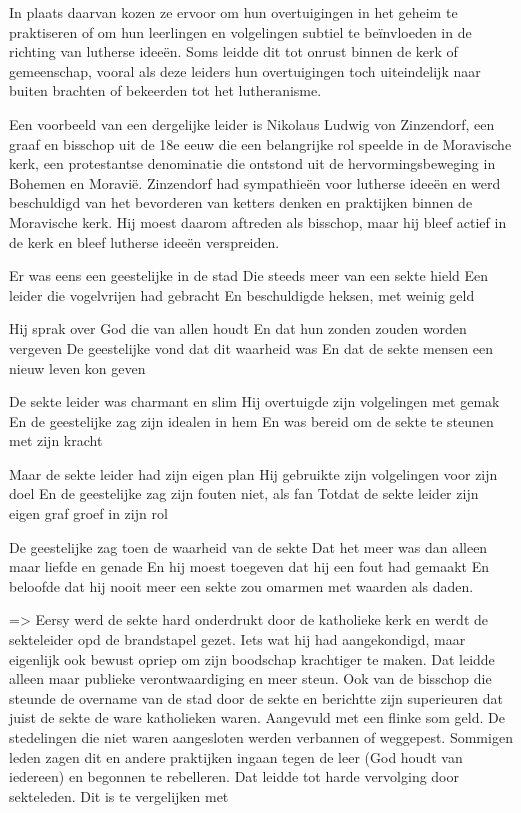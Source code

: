 In plaats daarvan kozen ze ervoor om hun overtuigingen in het geheim te praktiseren of om hun leerlingen en volgelingen subtiel te beïnvloeden in de richting van lutherse ideeën. Soms leidde dit tot onrust binnen de kerk of gemeenschap, vooral als deze leiders hun overtuigingen toch uiteindelijk naar buiten brachten of bekeerden tot het lutheranisme.

Een voorbeeld van een dergelijke leider is Nikolaus Ludwig von Zinzendorf, een graaf en bisschop uit de 18e eeuw die een belangrijke rol speelde in de Moravische kerk, een protestantse denominatie die ontstond uit de hervormingsbeweging in Bohemen en Moravië. Zinzendorf had sympathieën voor lutherse ideeën en werd beschuldigd van het bevorderen van ketters denken en praktijken binnen de Moravische kerk. Hij moest daarom aftreden als bisschop, maar hij bleef actief in de kerk en bleef lutherse ideeën verspreiden.

Er was eens een geestelijke in de stad
Die steeds meer van een sekte hield
Een leider die vogelvrijen had gebracht
En beschuldigde heksen, met weinig geld

Hij sprak over God die van allen houdt
En dat hun zonden zouden worden vergeven
De geestelijke vond dat dit waarheid was
En dat de sekte mensen een nieuw leven kon geven

De sekte leider was charmant en slim
Hij overtuigde zijn volgelingen met gemak
En de geestelijke zag zijn idealen in hem
En was bereid om de sekte te steunen met zijn kracht

Maar de sekte leider had zijn eigen plan
Hij gebruikte zijn volgelingen voor zijn doel
En de geestelijke zag zijn fouten niet, als fan
Totdat de sekte leider zijn eigen graf groef in zijn rol

De geestelijke zag toen de waarheid van de sekte
Dat het meer was dan alleen maar liefde en genade
En hij moest toegeven dat hij een fout had gemaakt
En beloofde dat hij nooit meer een sekte zou omarmen met waarden als daden.

=> Eersy werd de sekte hard onderdrukt door de katholieke kerk en werdt de sekteleider opd de brandstapel gezet. Iets wat hij had aangekondigd, maar eigenlijk ook bewust opriep om zijn boodschap krachtiger te maken. Dat leidde alleen maar publieke verontwaardiging en meer steun. Ook van de bisschop die steunde de overname van de stad door de sekte en berichtte zijn superieuren dat juist de sekte de ware katholieken waren. Aangevuld met een flinke som geld. De stedelingen die niet waren aangesloten werden verbannen of weggepest. Sommigen leden zagen dit en andere praktijken ingaan tegen de leer (God houdt van iedereen) en begonnen te rebelleren. Dat leidde tot harde vervolging door sekteleden. Dit is te vergelijken met


